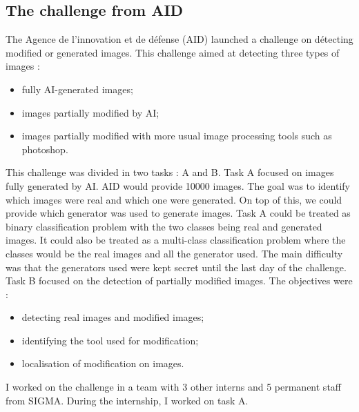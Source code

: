 \documentclass[12pt,a4paper]{article}
\begin{document}
\subsection*{The challenge from AID}
The Agence de l'innovation et de défense (AID) launched a challenge on détecting modified or generated images. This challenge aimed at detecting three types of images :
\begin{itemize}
    \item fully AI-generated images;
    \item images partially modified by AI;
    \item images partially modified with more usual image processing tools such as photoshop.
\end{itemize}
This challenge was divided in two tasks : A and B. Task A focused on images fully generated by AI. AID would provide 10000 images. The goal was to identify which images were real and which one were generated. On top of this, we could provide which generator was used to generate images. Task A could be treated as binary classification problem with the two classes being real and generated images. It could also be treated as a multi-class classification problem where the classes would be the real images and all the generator used. The main difficulty was that the generators used were kept secret until the last day of the challenge.\\
Task B focused on the detection of partially modified images. The objectives were :
\begin{itemize}
    \item detecting real images and modified images;
    \item identifying the tool used for modification;
    \item localisation of modification on images.
\end{itemize}

I worked on the challenge in a team with 3 other interns and 5 permanent staff from SIGMA. During the internship, I worked on task A.
\end{document}
